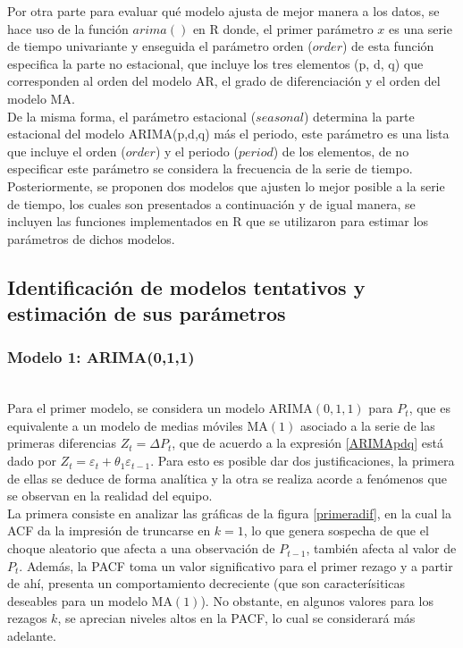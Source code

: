 \documentclass{article}
\theoremstyle{remark}
\begin{document}
Por otra parte para evaluar qué modelo ajusta de mejor manera a los datos, se hace uso de la función $arima()$ en R donde, el primer parámetro $x$ es una serie de tiempo univariante y enseguida el parámetro orden ($order$) de esta función especifica la parte no estacional, que incluye los tres elementos (p, d, q) que corresponden al orden del modelo AR, el grado de diferenciación y el orden del modelo MA. \\ 

De la misma forma, el parámetro estacional ($seasonal$) determina la parte estacional del modelo ARIMA(p,d,q) más el periodo, este parámetro es una lista que incluye el orden ($order$) y el periodo ($period$) de los elementos, de no especificar este parámetro se considera la frecuencia de la serie de tiempo. \\ 


Posteriormente, se proponen dos modelos que ajusten lo mejor posible a la serie de tiempo, los cuales son presentados a continuación y de igual manera, se incluyen las funciones implementados en R que se utilizaron para estimar los parámetros de dichos modelos. 

\subsection{Identificación de modelos tentativos y estimación de sus parámetros}

\subsubsection{Modelo 1: ARIMA(0,1,1)}\\
 
Para el primer modelo, se considera un modelo ARIMA$(0,1,1)$ para $P_t$, que es equivalente a un modelo de medias móviles MA$(1)$ asociado a la serie de las primeras diferencias $Z_t = \Delta P_t$, que de acuerdo a la expresión \eqref{ARIMApdq} está dado por $Z_t = \varepsilon_t + \theta_1\varepsilon_{t-1} $. Para esto es posible dar dos justificaciones, la primera de ellas se deduce de forma analítica y la otra se realiza acorde a fenómenos que se observan en la realidad del equipo.\\ 

La primera consiste en analizar las gráficas de la figura \ref{primeradif}, en la cual la ACF da la impresión de truncarse en $k=1$, lo que genera sospecha de que el choque aleatorio que afecta a una observación de $P_{t-1}$, también afecta al valor de $P_t$. Además, la PACF toma un valor significativo para el primer rezago y a partir de ahí, presenta un comportamiento decreciente (que son caracterísiticas deseables para un modelo MA$(1)$). No obstante, en algunos valores para los rezagos $k$, se aprecian niveles altos en la PACF, lo cual se considerará más adelante.\\
\end{document}
